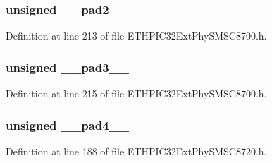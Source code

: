 \subsubsection[{\+\_\+\+\_\+pad2\+\_\+\+\_\+}]{\setlength{\rightskip}{0pt plus 5cm}unsigned \+\_\+\+\_\+pad2\+\_\+\+\_\+}\label{union_____p_h_y_c_t_r_lbits__t_a4d97cc5f7d51d22fc2bf3eab35c9cb7f}


Definition at line 213 of file E\+T\+H\+P\+I\+C32\+Ext\+Phy\+S\+M\+S\+C8700.\+h.

\hypertarget{union_____p_h_y_c_t_r_lbits__t_ad7d7cee33e0c7f447abc4d171c628dd4}{}
\subsubsection[{\+\_\+\+\_\+pad3\+\_\+\+\_\+}]{\setlength{\rightskip}{0pt plus 5cm}unsigned \+\_\+\+\_\+pad3\+\_\+\+\_\+}\label{union_____p_h_y_c_t_r_lbits__t_ad7d7cee33e0c7f447abc4d171c628dd4}


Definition at line 215 of file E\+T\+H\+P\+I\+C32\+Ext\+Phy\+S\+M\+S\+C8700.\+h.

\hypertarget{union_____p_h_y_c_t_r_lbits__t_a8d1e932de3f1bdec682271c90f2ca15c}{}
\subsubsection[{\+\_\+\+\_\+pad4\+\_\+\+\_\+}]{\setlength{\rightskip}{0pt plus 5cm}unsigned \+\_\+\+\_\+pad4\+\_\+\+\_\+}\label{union_____p_h_y_c_t_r_lbits__t_a8d1e932de3f1bdec682271c90f2ca15c}


Definition at line 188 of file E\+T\+H\+P\+I\+C32\+Ext\+Phy\+S\+M\+S\+C8720.\+h.

\hypertarget{union_____p_h_y_c_t_r_lbits__t_a6df3bf63e0997c63a76308dd8e93971e}{}
